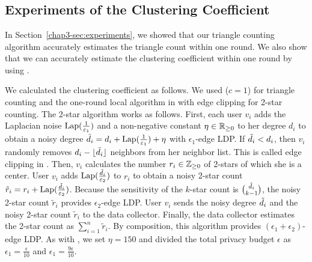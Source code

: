 \graphicspath{{./chapters/chapter3/}}
\chapter{ }

\allowdisplaybreaks[1]


\section{Experiments of the Clustering Coefficient}
\label{chap3-sec:cluster}
In Section~\ref{chap3-sec:experiments}, we showed that our triangle counting algorithm \AlgWSTriVR{} accurately estimates the triangle count within one round.
We also show that we can accurately estimate the clustering coefficient within one round by using \AlgWSTriVR{}.

We calculated the clustering coefficient as follows.
We used \AlgWSTriVR{} ($c=1$) for triangle counting and
the one-round local algorithm in \cite{Imola_USENIX21} with edge clipping \cite{Imola_USENIX22}
for 2-star counting.
The 2-star algorithm works as follows.
First, each user $v_i$ adds the Laplacian noise $\textrm{Lap}(\frac{1}{\varepsilon_1})$ and a non-negative constant $\eta \in \mathbb{R}_{\ge0}$ to her degree $d_i$ to obtain a noisy degree $\tilde{d}_i = d_i + \textrm{Lap}(\frac{1}{\varepsilon_1}) + \eta$ with $\epsilon_1$-edge LDP.
If $\tilde{d}_i < d_i$, then $v_i$ randomly removes $d_i - \lfloor \tilde{d}_i \rfloor$ neighbors from her neighbor list.
This is called edge clipping in \cite{Imola_USENIX22}.
Then, $v_i$ calculates the number $r_i \in \mathbb{Z}_{\ge0}$ of 2-stars of which she is a center.
User $v_i$ adds $\textrm{Lap}(\frac{\tilde{d}_i}{\varepsilon_2})$ to $r_i$ to obtain a noisy 2-star count $\tilde{r}_i = r_i + \textrm{Lap}(\frac{\tilde{d}_i}{\varepsilon_2})$.
Because the sensitivity of the $k$-star count is $\binom{\tilde{d}_i}{k-1}$, the noisy 2-star count $\tilde{r}_i$ provides $\epsilon_2$-edge LDP.
User $v_i$ sends the noisy degree $\tilde{d}_i$ and the noisy 2-star count $\tilde{r}_i$ to the data collector.
Finally, the data collector estimates the 2-star count as $\sum_{i=1}^n \tilde{r}_i$.
By composition, this algorithm provides $(\epsilon_1 + \epsilon_2)$-edge LDP.
As with \cite{Imola_USENIX22}, we set $\eta = 150$ and divided the total privacy budget $\epsilon$ as $\epsilon_1 = \frac{\epsilon}{10}$ and $\epsilon_1 = \frac{9\epsilon}{10}$.

